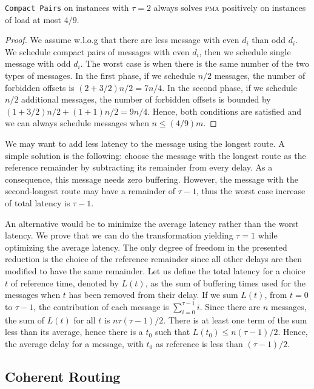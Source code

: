\documentclass[a4paper,UKenglish,cleveref, autoref, thm-restate]{lipics-v2019}
\newcommand\pma{\textsc{pma}\xspace}
\newcommand\compactpair{\texttt{Compact Pairs}\xspace}
\begin{document}
\begin{theorem}
\compactpair on instances with $\tau =2$ always solves \pma positively on instances of load at most $4/9$.
\end{theorem}
\begin{proof}
We assume w.l.o.g that there are less message with even $d_i$ than odd $d_i$.
We schedule compact pairs of messages with even $d_i$, then we schedule single message with odd $d_i$. The worst case is when there is the same number of the two types of messages. In the first phase, if we schedule $n/2$ messages, the number of forbidden offsets is $(2 + 3/2)n/2 = 7n/4$. In the second phase, if we schedule $n/2$ additional messages, the number of forbidden offsets is bounded by $ (1 + 3/2) n/2  + (1 + 1)n/2 = 9n/4$. Hence, both conditions are satisfied and we can always schedule messages when $n \leq (4/9)m$.
\end{proof}


We may want to add less latency to the message using the longest route. A simple solution is the following: choose the message with the longest route as the reference remainder by subtracting its remainder from every delay. As a consequence, this message needs zero buffering. However, the message with the second-longest route may have a remainder of $\tau -1$, thus the worst case increase of total latency is $\tau -1$. 

An alternative would be to minimize the average latency rather than the worst latency.
We prove that we can do the transformation yielding $\tau=1$ while optimizing the average latency. 
 The only degree of freedom in the presented reduction is the choice of the reference remainder since all other delays are then modified to have the same remainder. Let us define the total latency for a choice $t$ of reference time, denoted by $L(t)$, as the sum of buffering times used for the messages when $t$ has been removed from their delay.
If we sum $L(t)$, from $t=0$ to $\tau-1$, the contribution of each message is $\sum_{i=0}^{\tau-1} i$. Since there are $n$ messages, the sum of $L(t)$ for all $t$ is $n \tau (\tau-1)/2$. There is at least one term of the sum less than its average, hence there is a $t_0$ such that $L(t_0) \leq n (\tau-1)/2$. Hence, the average delay for a message, with $t_0$ as reference is less than $(\tau -1)/2$.

\subsection{Coherent Routing}\label{sec:coherent}
\end{document}
